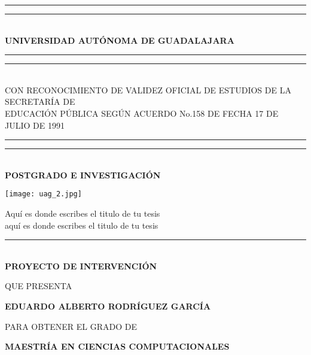 
\begin{titlepage}
    \begin{center}
        \rule{\textwidth}{4pt}\vspace*{-\baselineskip}\vspace*{2pt} %
        \rule{\textwidth}{1pt}\\[\baselineskip] %
        \textbf{\normalsize UNIVERSIDAD AUTÓNOMA DE GUADALAJARA} %
        \rule{\textwidth}{0.4pt}\vspace*{-\baselineskip}\vspace{3.2pt} %
        \rule{\textwidth}{1.6pt}\\[\baselineskip] %
        
        {\tiny CON RECONOCIMIENTO DE VALIDEZ OFICIAL DE ESTUDIOS DE LA SECRETARÍA DE \\ EDUCACIÓN PÚBLICA SEGÚN ACUERDO No.158 DE FECHA 17 DE JULIO DE 1991} %
        \rule{\textwidth}{0.4pt}\vspace*{-\baselineskip}\vspace{3.2pt} %
        \rule{\textwidth}{1.6pt}\\[\baselineskip] %

        \textbf{\small POSTGRADO E INVESTIGACIÓN} %
        
        \vspace*{1.2cm}
        \texttt{[image: uag\_2.jpg]}
        \vspace*{1.2cm}
        
        {\small Aquí es donde escribes el titulo de tu tesis \\ aquí es donde escribes el titulo de tu tesis}
        \rule{\textwidth}{0.6pt}\\[\baselineskip] %
        
        \textbf{\small PROYECTO DE INTERVENCIÓN} %
        \vspace*{1.2cm} 
        
        {\scriptsize QUE PRESENTA}
        
        \textbf{\scriptsize EDUARDO ALBERTO RODRÍGUEZ GARCÍA }
        \vspace*{1.2cm}
        
        {\scriptsize PARA OBTENER EL GRADO DE}
        
        \textbf{\small MAESTRÍA EN CIENCIAS COMPUTACIONALES} %
        \vspace*{1.2cm}
        

\end{center}
\end{titlepage}
